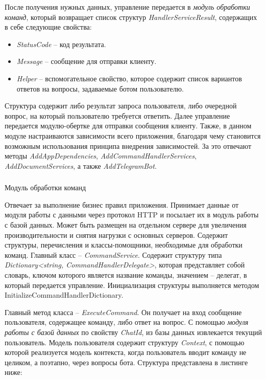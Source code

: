 После получения нужных данных, управление передается в \emph{модуль обработки команд}, который возвращает список структур \linebreak \emph{HandlerServiceResult}, содержащих в себе следующие свойства:

\begin{itemize}
	\item \emph{StatusCode} – код результата.
	\item \emph{Message} – сообщение для отправки клиенту.
	\item \emph{Helper} – вспомогательное свойство, которое содержит список
вариантов ответов на вопросы, задаваемые ботом пользователю.
\end{itemize}

Структура содержит либо результат запроса пользователя, либо очередной вопрос, на который пользователю требуется ответить.
Далее управление передается модулю-обертке для отправки сообщения клиенту.
Также, в данном модуле настраиваются зависимости всего приложения, благодаря чему становится возможным использования принципа внедрения зависимостей. За это отвечают методы \emph{AddAppDependencies}, \emph{AddCommandHandler\linebreak Services}, \emph{AddDocumentServices}, а также \emph{AddTelegramBot}.

\subsubsection{} Модуль обработки команд
\label{sec:design:server:framework}

Отвечает за выполнение бизнес правил приложения. Принимает данные от модуля работы с данными через протокол HTTP и посылает их в модуль работы с базой данных. Может быть размещен на отдельном сервере для увеличения производительности и снятия нагрузки с основных серверов.
Содержит структуры, перечисления и классы-помощники, необходимые для обработки команд.
Главный класс – \emph{CommandService}. Содержит структуру типа \emph{Dictionary<string, CommandHandlerDelegate>}, которая представляет собой словарь, ключом которого является название команды, значением – делегат, в который передается управление.
Инициализация структуры выполняется методом InitializeCommandHandlerDictionary.

Главный метод класса – \emph{ExecuteCommand}. Он получает на вход сообщение пользователя, содержащее команду, либо ответ на вопрос. С помощью \emph{модуля работы с базой данных} по свойству \emph{ChatId}, из базы данных извлекается текущий пользователь.
Модель пользователя содержит структуру \emph{Context}, с помощью которой реализуется модель контекста, когда пользователь вводит команду не целиком, а поэтапно, через вопросы бота. Структура представлена в листинге ниже:

